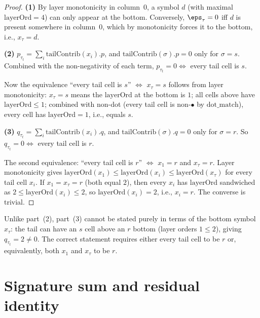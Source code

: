 \begin{proof}
  \leanok

  \textbf{(1)} By layer monotonicity in column~0, a symbol $d$ (with maximal
  $\mathrm{layerOrd} = 4$) can only appear at the bottom.
  Conversely, $\eps_\tau = 0$ iff $d$ is present somewhere in column~0, which
  by monotonicity forces it to the bottom, i.e., $x_\tau = d$.

  \textbf{(2)} $p_{\tau_t} = \sum_i \mathrm{tailContrib}(x_i).p$, and
  $\mathrm{tailContrib}(\sigma).p = 0$ only for $\sigma = s$. Combined with
  the non-negativity of each term, $p_{\tau_t} = 0 \iff $ every tail cell is $s$.

  Now the equivalence ``every tail cell is $s$'' $\iff$ $x_\tau = s$ follows
  from layer monotonicity: $x_\tau = s$ means the $\mathrm{layerOrd}$ at the
  bottom is $1$; all cells above have $\mathrm{layerOrd} \leq 1$; combined
  with non-dot (every tail cell is non-$\bullet$ by $\mathrm{dot\_match}$),
  every cell has $\mathrm{layerOrd} = 1$, i.e., equals $s$.

  \textbf{(3)} $q_{\tau_t} = \sum_i \mathrm{tailContrib}(x_i).q$, and
  $\mathrm{tailContrib}(\sigma).q = 0$ only for $\sigma = r$. So
  $q_{\tau_t} = 0 \iff$ every tail cell is $r$.

  The second equivalence: ``every tail cell is $r$'' $\iff$ $x_1 = r$ and
  $x_\tau = r$. Layer monotonicity gives
  $\mathrm{layerOrd}(x_1) \leq \mathrm{layerOrd}(x_i) \leq \mathrm{layerOrd}(x_\tau)$
  for every tail cell $x_i$. If $x_1 = x_\tau = r$ (both equal $2$), then
  every $x_i$ has $\mathrm{layerOrd}$ sandwiched as $2 \leq \mathrm{layerOrd}(x_i) \leq 2$,
  so $\mathrm{layerOrd}(x_i) = 2$, i.e., $x_i = r$. The converse is trivial.
\end{proof}

\begin{remark}
  Unlike part~(2), part~(3) cannot be stated purely in terms of the bottom
  symbol $x_\tau$: the tail can have an $s$ cell above an $r$ bottom (layer
  orders $1 \leq 2$), giving $q_{\tau_t} = 2 \neq 0$. The correct statement
  requires either every tail cell to be $r$ or, equivalently, both $x_1$ and
  $x_\tau$ to be $r$.
\end{remark}

\section{Signature sum and residual identity}

